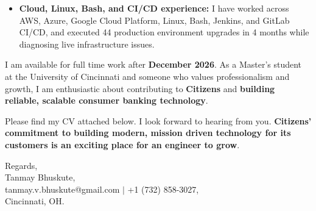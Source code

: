 \documentclass[11pt]{letter}
\begin{document}
\begin{letter}{}
\begin{itemize}[leftmargin=*, itemsep=0.45em]
    \item \textbf{Cloud, Linux, Bash, and CI/CD experience:} I have worked across AWS, Azure, Google Cloud Platform, Linux, Bash, Jenkins, and GitLab CI/CD, and executed 44 production environment upgrades in 4 months while diagnosing live infrastructure issues.
\end{itemize}

I am available for full time work after \textbf{December 2026}. As a Master's student at the University of Cincinnati and someone who values professionalism and growth, I am enthusiastic about contributing to \textbf{Citizens} and \textbf{building reliable, scalable consumer banking technology}.

Please find my CV attached below. I look forward to hearing from you. \textbf{Citizens' commitment to building modern, mission driven technology for its customers is an exciting place for an engineer to grow}.

{\setlength{\parskip}{0pt}
Regards,\\
Tanmay Bhuskute,\\
tanmay.v.bhuskute@gmail.com $\mid$ +1 (732) 858-3027,\\
Cincinnati, OH.
}

\end{letter}
\end{document}
